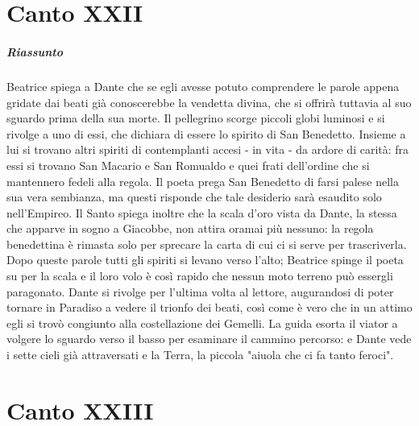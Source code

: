 \documentclass[a4paper, twoside, titlepage]{book}
\begin{document}
\chapter{Canto XXII}

\paragraph{Riassunto} Beatrice spiega a Dante che se egli avesse potuto comprendere le parole appena gridate dai beati già conoscerebbe la vendetta divina, che si offrirà tuttavia al suo sguardo prima della sua morte. Il pellegrino scorge piccoli globi luminosi e si rivolge a uno di essi, che dichiara di essere lo spirito di San Benedetto. Insieme a lui si trovano altri spiriti di contemplanti accesi - in vita - da ardore di carità: fra essi si trovano San Macario e San Romualdo e quei frati dell’ordine che si mantennero fedeli alla regola. Il poeta prega San Benedetto di farsi palese nella sua vera sembianza, ma questi risponde che tale desiderio sarà esaudito solo nell’Empireo. Il Santo spiega inoltre che la scala d’oro vista da Dante, la stessa che apparve in sogno a Giacobbe, non attira oramai più nessuno: la regola benedettina è rimasta solo per sprecare la carta di cui ci si serve per trascriverla. Dopo queste parole tutti gli spiriti si levano verso l’alto; Beatrice spinge il poeta su per la scala e il loro volo è così rapido che nessun moto terreno può essergli paragonato. Dante si rivolge per l’ultima volta al lettore, augurandosi di poter tornare in Paradiso a vedere il trionfo dei beati, così come è vero che in un attimo egli si trovò congiunto alla costellazione dei Gemelli. La guida esorta il viator a volgere lo sguardo verso il basso per esaminare il cammino percorso: e Dante vede i sette cieli già attraversati e la Terra, la piccola "aiuola che ci fa tanto feroci".

\chapter{Canto XXIII}
\end{document}
